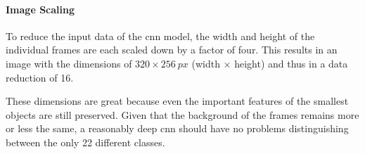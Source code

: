 \paragraph{Image Scaling}
To reduce the input data of the \acrshort{cnn} model, the width and height of the individual frames are each scaled down by a factor of four.
This results in an image with the dimensions of $320\times\SI{256}{px}$ (width $\times$ height) and thus in a data reduction of \num{16}.

These dimensions are great because even the important features of the smallest objects are still preserved.
Given that the background of the frames remains more or less the same, a reasonably deep \acrshort{cnn} should have no problems distinguishing between the only \num{22} different classes.

